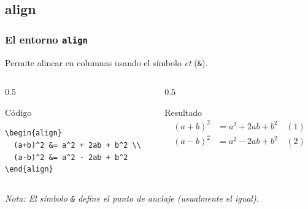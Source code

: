 \documentclass[12pt,aspectratio=169,ignorenonframetext]{ltxbeamer}
\begin{document}
\subsection{align}
\begin{frame}[fragile]
\frametitle{El entorno \texttt{align}}
Permite alinear en columnas usando el símbolo \emph{et} (\texttt{\&}).

\begin{columns}
    \begin{column}{0.5\textwidth}
        \begin{block}{Código}
\begin{verbatim}
\begin{align}
  (a+b)^2 &= a^2 + 2ab + b^2 \\
  (a-b)^2 &= a^2 - 2ab + b^2
\end{align}
\end{verbatim}
        \end{block}
    \end{column}

    \begin{column}{0.5\textwidth}
        \begin{exampleblock}{Resultado}
            \begin{equation*}
                \begin{aligned}
                    (a+b)^2 &= a^2 + 2ab + b^2 \quad (1) \\
                    (a-b)^2 &= a^2 - 2ab + b^2 \quad (2)
                \end{aligned}
            \end{equation*}
        \end{exampleblock}
    \end{column}
\end{columns}
\bigskip
\small \textit{Nota: El símbolo \texttt{\&} define el punto de anclaje (usualmente el igual).}
\end{frame}
\end{document}

